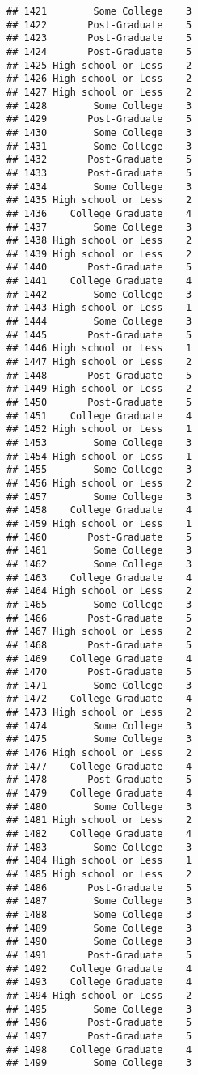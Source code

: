 \documentclass[
]{article}
\begin{document}
\begin{verbatim}
## 1421        Some College    3
## 1422       Post-Graduate    5
## 1423       Post-Graduate    5
## 1424       Post-Graduate    5
## 1425 High school or Less    2
## 1426 High school or Less    2
## 1427 High school or Less    2
## 1428        Some College    3
## 1429       Post-Graduate    5
## 1430        Some College    3
## 1431        Some College    3
## 1432       Post-Graduate    5
## 1433       Post-Graduate    5
## 1434        Some College    3
## 1435 High school or Less    2
## 1436    College Graduate    4
## 1437        Some College    3
## 1438 High school or Less    2
## 1439 High school or Less    2
## 1440       Post-Graduate    5
## 1441    College Graduate    4
## 1442        Some College    3
## 1443 High school or Less    1
## 1444        Some College    3
## 1445       Post-Graduate    5
## 1446 High school or Less    1
## 1447 High school or Less    2
## 1448       Post-Graduate    5
## 1449 High school or Less    2
## 1450       Post-Graduate    5
## 1451    College Graduate    4
## 1452 High school or Less    1
## 1453        Some College    3
## 1454 High school or Less    1
## 1455        Some College    3
## 1456 High school or Less    2
## 1457        Some College    3
## 1458    College Graduate    4
## 1459 High school or Less    1
## 1460       Post-Graduate    5
## 1461        Some College    3
## 1462        Some College    3
## 1463    College Graduate    4
## 1464 High school or Less    2
## 1465        Some College    3
## 1466       Post-Graduate    5
## 1467 High school or Less    2
## 1468       Post-Graduate    5
## 1469    College Graduate    4
## 1470       Post-Graduate    5
## 1471        Some College    3
## 1472    College Graduate    4
## 1473 High school or Less    2
## 1474        Some College    3
## 1475        Some College    3
## 1476 High school or Less    2
## 1477    College Graduate    4
## 1478       Post-Graduate    5
## 1479    College Graduate    4
## 1480        Some College    3
## 1481 High school or Less    2
## 1482    College Graduate    4
## 1483        Some College    3
## 1484 High school or Less    1
## 1485 High school or Less    2
## 1486       Post-Graduate    5
## 1487        Some College    3
## 1488        Some College    3
## 1489        Some College    3
## 1490        Some College    3
## 1491       Post-Graduate    5
## 1492    College Graduate    4
## 1493    College Graduate    4
## 1494 High school or Less    2
## 1495        Some College    3
## 1496       Post-Graduate    5
## 1497       Post-Graduate    5
## 1498    College Graduate    4
## 1499        Some College    3

\end{verbatim}
\end{document}
